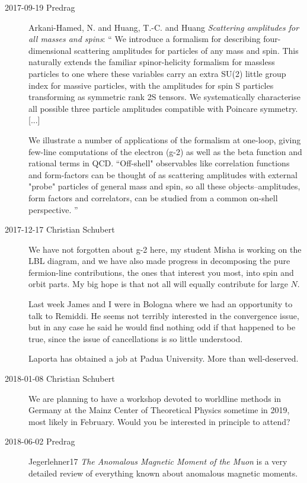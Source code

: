 \begin{description}
\item[2017-09-19 Predrag]
Arkani-Hamed, N. and Huang, T.-C. and Huang
{\em Scattering amplitudes for all masses and spins}: ``
We introduce a formalism for describing four-dimensional scattering
amplitudes for particles of any mass and spin. This naturally extends the
familiar spinor-helicity formalism for massless particles to one where these
variables carry an extra SU(2) little group index for massive particles, with
the amplitudes for spin S particles transforming as symmetric rank 2S
tensors. We systematically characterise all possible three particle
amplitudes compatible with Poincare symmetry. [...]

We illustrate a number of
applications of the formalism at one-loop, giving few-line computations of
the electron (g-2) as well as the beta function and rational terms in QCD.
``Off-shell" observables like correlation functions and form-factors can be
thought of as scattering amplitudes with external "probe" particles of
general mass and spin, so all these objects--amplitudes, form factors and
correlators, can be studied from a common on-shell perspective.
''

\item[2017-12-17 Christian Schubert]
We have not forgotten about g-2 here, my student Misha is working on the
LBL diagram, and we have also made progress in decomposing the pure
fermion-line contributions, the ones that interest you most, into spin
and orbit parts. My big hope is that not all will equally contribute for
large $N$.

Last week James and I were in Bologna where we had an opportunity to talk
to Remiddi. He seems not terribly interested in the convergence issue,
but in any case he said he would find nothing odd if that happened to be
true, since the issue of cancellations is so little understood.

Laporta has obtained a job at Padua University. More than well-deserved.

\item[2018-01-08 Christian Schubert]
We are planning to have a workshop devoted to worldline methods in
Germany at the Mainz Center of Theoretical Physics sometime in 2019, most
likely in February. Would you be interested in principle to attend?

\item[2018-06-02 Predrag]
Jegerlehner17
{\em The Anomalous Magnetic Moment of the Muon}
is a very detailed review of everything known about anomalous
magnetic moments.


\end{description}
